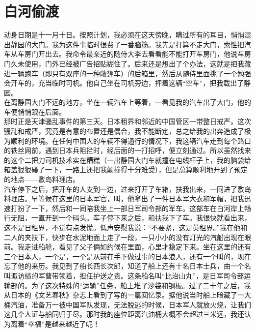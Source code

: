 \fancyhead[RO]{} %
\fancyhead[LE]{} %
\chapter*{白河偷渡}
\thispagestyle{empty}
动身日期是十一月十日。按照计划，我必须在这天傍晚，瞒过所有的耳目，悄悄混出静园的大门。我为这件事临时很费了一番脑筋。我先是打算不走大门，索性把汽车从车房门开出去。我命令最亲近的随侍大李去看看能不能打开车房门，他说车房门久未使用，门外已经被广告招贴糊住了。后来还是想出了个办法，这就是把我藏进一辆跑车（即只有双座的一种敞篷车）的后箱里，然后从随侍里面挑了一个勉强会开车的，充当临时司机。他自己坐在司机旁边，押着这辆“空车”，把我载出了静园。\\

在离静园大门不远的地方，坐在一辆汽车上等着，一看见我的汽车出了大门，他的车便悄悄跟在后面。\\

那时正是天津骚乱事件的第三天。日本租界和邻近的中国管区一带整日戒严。这次骚乱和戒严，究竟是有意的布置还是偶合，我不能断定，总之给我的出奔造成了极为顺利的环境。在任何中国人的车辆不得通行的情况下，我这辆汽车走到每个路口的铁丝网前，遇到日本兵阻拦时，经后面的一打招呼，便立刻通过。所以虽然找来的这个二把刀司机技术实在糟糕（一出静园大门车就撞在电线杆子上，我的脑袋给箱盖狠狠碰了一下，一路上还把我颠撞得十分难受），但是总算顺利地开到了预定的地点——敷岛料理店。\\

汽车停下之后，把开车的人支到一边，过来打开了车箱，扶我出来，一同进了敷岛料理店。早等候在这里的日本军官，叫，他拿出了一件日本军大衣和军帽，把我迅速打扮了一下，然后和一同陪我坐上一部日军司令部的军车。这部车在白河岸上畅行无阻，一直开到一个码头。车子停下来之后，和扶我下了车。我很快就看出来，这不是日租界，不觉有点发慌。低声安慰我说：“不要紧，这是英租界。”我在他和二人的夹扶下，快步在水泥地面上走了一段，一只小小的没有灯光的汽船出现在眼前。我走进船舱，看见了父子俩如约候在里面，心里才稳定下来。坐在这里的还有三个日本人，一个是，一个是从前在手下做过事的日本浪人，还有一个叫的，现在忘了他的来历。我见到了船长西长次郎，知道了船上还有十名日本士兵，由一个名叫诹访绩的军曹带领着，担任护送之责。这条船名叫“比治山丸”，是日军司令部运输部的。为了这次特殊的“运输”任务，船上堆了沙袋和钢板。过了二十年之后，我从日本的《文艺春秋》杂志上看到了写的一篇回忆录。据他说当时船上暗藏了一大桶汽油，准备万一被中国军队发现，无法脱逃的时候，日本军人就放火烧，让我们这几个人证与船同归于尽。那时我的座位距离汽油桶大概不会超过三米远，我还认为离着“幸福”是越来越近了呢！\\

